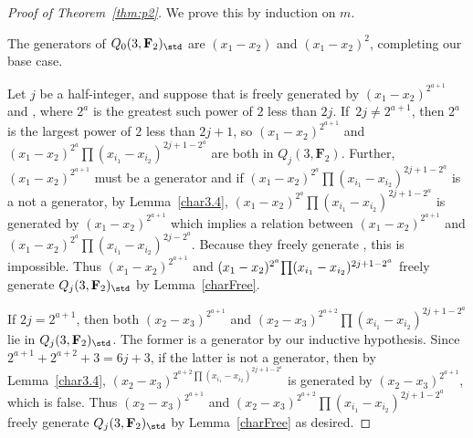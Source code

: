 \begin{proof}[Proof of Theorem~\ref{thm:p2}]
 We prove this by induction on $m$.

 The generators of $Q_0(3,\mathbf{F}_2)_{\std}$ are $(x_1-x_2)$ and $(x_1-x_2)^2$, completing our base case.

 Let $j$ be a half-integer, and suppose that  is freely generated by $(x_1-x_2)^{2^{a+1}}$ and ,
 where $2^a$ is the greatest such power of $2$ less than $2j$. If~${2j\neq 2^{a+1}}$, then $2^{a}$ is the largest power of $2$ less than $2j+1$, so $(x_1-x_2)^{2^{a+1}}$ and $(x_1-x_2)^{2^a}\prod (x_{i_1}-x_{i_2})^{2j+1-2^a}$ are both in $Q_j(3,\mathbf{F}_2)$. Further, $(x_1-x_2)^{2^{a+1}}$ must be a generator and if $(x_1-x_2)^{2^a}\prod (x_{i_1}-x_{i_2})^{2j+1-2^a}$ is a not a generator, by Lemma~\ref{char3.4}, $(x_1-x_2)^{2^a}\prod (x_{i_1}-x_{i_2})^{2j+1-2^a}$ is generated by $(x_1-x_2)^{2^{a+1}}$ which implies a relation between $(x_1-x_2)^{2^{a+1}}$ and ${(x_1-x_2)^{2^a}\prod (x_{i_1}-x_{i_2})^{2j-2^a}}$. Because they freely generate , this is impossible. Thus $(x_1-x_2)^{2^{a+1}}$ and $(x_1-x_2)^{2^a}\smash{\prod (x_{i_1}-x_{i_2})^{2j+1-2^a}}$ freely generate $Q_j(3,\mathbf{F}_2)_{\std}$ by Lemma~\ref{charFree}.

 If $2j= 2^{a+1}$, then both $(x_2-x_3)^{2^{a+1}}$ and $(x_2-x_3)^{2^{a+2}}\prod (x_{i_1}-x_{i_2})^{2j+1-2^a}$ lie in $Q_j(3,\mathbf{F}_2)_{\std}$. The former is a generator by our inductive hypothesis.
 Since $2^{a+1}+2^{a+2}+3=6j+3$, if the latter is not a generator, then by Lemma~\ref{char3.4}, $(x_2-x_3)^{2^{a+2}\prod (x_{i_1}-x_{i_2})^{2j+1-2^a}}$ is generated by $(x_2-x_3)^{2^{a+1}}$, which is false. Thus $(x_2-x_3)^{2^{a+1}}$ and $(x_2-x_3)^{2^{a+2}}\prod (x_{i_1}-x_{i_2})^{2j+1-2^a}$ freely generate $Q_j(3,\mathbf{F}_2)_{\std}$ by Lemma~\ref{charFree} as desired.
\end{proof}
